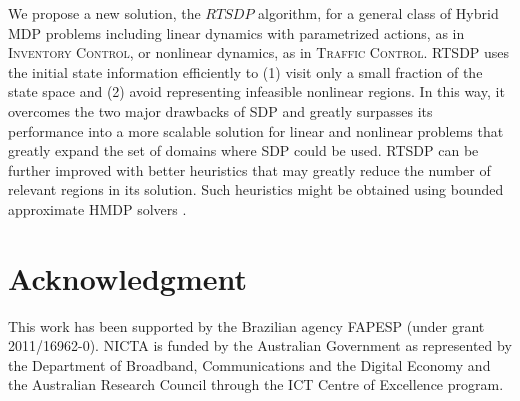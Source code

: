 \documentclass[letterpaper]{article}
\newcommand{\Invent}{\textsc{Inventory Control}}
\newcommand{\Traffic}{\textsc{Traffic Control}}
\begin{document}
We propose a new solution, the $RTSDP$ algorithm, for a general class of Hybrid MDP problems including linear dynamics with parametrized actions, as in \Invent, or nonlinear dynamics, as in \Traffic.
RTSDP uses the initial state information efficiently to (1) visit only a small fraction of the state space and (2) avoid representing infeasible nonlinear regions. In this way, it overcomes the two major drawbacks of SDP and greatly surpasses its performance into a more scalable solution for linear and nonlinear problems that greatly expand the set of domains where SDP could be used.
RTSDP can be further improved with better heuristics that may greatly reduce the  number of relevant regions in its solution. 
Such heuristics might be obtained using bounded approximate HMDP solvers \cite{vianna13}.



\section*{Acknowledgment}
This work has been supported by the Brazilian agency FAPESP (under 
 grant 2011/16962-0). NICTA is funded by the
 Australian Government as represented by
the Department of Broadband, Communications and the Digital
Economy and the Australian Research Council through the ICT
Centre of Excellence program.



\end{document}
